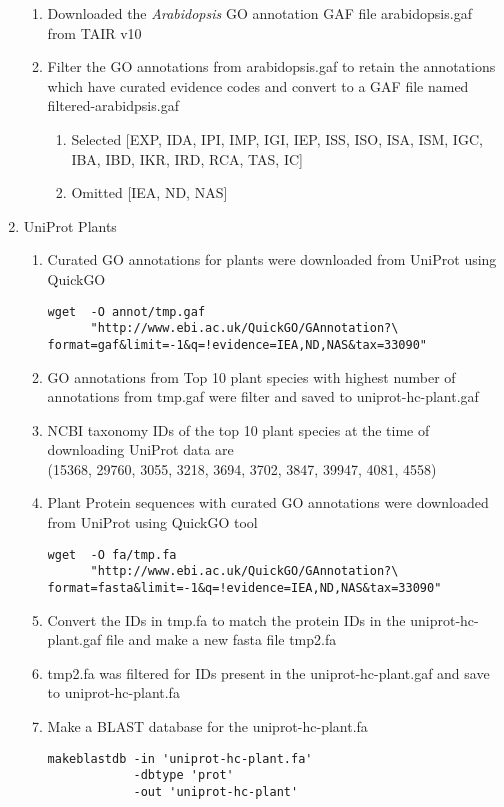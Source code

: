 \documentclass[11pt,letterpaper]{article}
\begin{document}
\begin{enumerate}
\begin{enumerate}
      \item Downloaded the \emph{Arabidopsis} GO annotation GAF file arabidopsis.gaf  from TAIR v10
      \item Filter the GO annotations from arabidopsis.gaf to retain the annotations which have curated evidence codes and convert to a GAF file named filtered-arabidpsis.gaf \\
            \begin{enumerate}
              \item Selected [EXP, IDA, IPI, IMP, IGI, IEP, ISS, ISO, ISA, ISM, IGC, IBA, IBD, IKR, IRD, RCA, TAS, IC]
              \item Omitted [IEA, ND, NAS]
            \end{enumerate}
    \end{enumerate}
    \item UniProt Plants
    \begin{enumerate}
      \item Curated GO annotations for plants were downloaded from UniProt using QuickGO
      \begin{verbatim}
wget  -O annot/tmp.gaf
      "http://www.ebi.ac.uk/QuickGO/GAnnotation?\ format=gaf&limit=-1&q=!evidence=IEA,ND,NAS&tax=33090"
      \end{verbatim}
      \item GO annotations from Top 10 plant species with highest number of annotations from tmp.gaf were filter and saved to uniprot-hc-plant.gaf
      \item NCBI taxonomy IDs of the top 10 plant species at the time of downloading UniProt data are \\
      (15368, 29760, 3055, 3218, 3694, 3702, 3847, 39947, 4081, 4558)
      \item Plant Protein sequences with curated GO annotations were downloaded from UniProt using QuickGO tool
      \begin{verbatim}
wget  -O fa/tmp.fa
      "http://www.ebi.ac.uk/QuickGO/GAnnotation?\ format=fasta&limit=-1&q=!evidence=IEA,ND,NAS&tax=33090"
      \end{verbatim}
      \item Convert the IDs in tmp.fa to match the protein IDs in the uniprot-hc-plant.gaf file and make a new fasta file tmp2.fa
      \item tmp2.fa was filtered for IDs present in the uniprot-hc-plant.gaf and save to uniprot-hc-plant.fa
      \item Make a BLAST database for the uniprot-hc-plant.fa
      \begin{verbatim}
makeblastdb -in 'uniprot-hc-plant.fa'
            -dbtype 'prot'
            -out 'uniprot-hc-plant'
      \end{verbatim}
  \end{enumerate}
  \end{enumerate}
\end{document}
